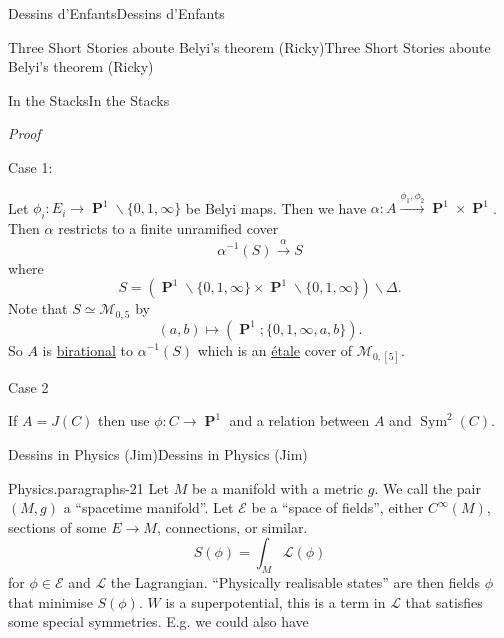 \documentclass[10pt,]{book}
\makeatletter
\renewcommand*{\proofname}{Proof}
\renewenvironment{proof}[1][\proofname]{\par
  \pushQED{\qed}%
  \normalfont \topsep6\p@\@plus6\p@\relax
  \trivlist
  \item\relax
    {\itshape
    #1\@addpunct{.}}\hspace\labelsep\ignorespaces
}{%
  \popQED\endtrivlist\@endpefalse
}
\numberwithin{equation}{section}
\newcommand{\cinf}{C^\infty}
\newcommand{\inv}{^{-1}}
\newcommand{\lb}{[}
\newcommand{\rb}{]}
\DeclareMathOperator{\PP}{\mathbf{P}}
\DeclareMathOperator{\Sym}{Sym}
\makeatother
\begin{document}
\begin{chapterptx}{Dessins d'Enfants}{}{Dessins d'Enfants}{}{}
\begin{sectionptx}{Three Short Stories aboute Belyi's theorem (Ricky)}{}{Three Short Stories aboute Belyi's theorem (Ricky)}{}{}
\begin{subsectionptx}{In the Stacks}{}{In the Stacks}{}{}
\begin{proof}
\hypertarget{p-766}{}%
Case 1:%
\par
\hypertarget{p-767}{}%
Let \(\phi_i \colon E_i \to \PP^1\smallsetminus \{0,1,\infty\}\) be Belyi maps. Then we have \(\alpha \colon A \xrightarrow{\phi_1,\phi_2} \PP^1 \times \PP^1\). Then \(\alpha\) restricts to a finite unramified cover%
\begin{equation*}
\alpha\inv (S) \xrightarrow \alpha S
\end{equation*}
where%
\begin{equation*}
S = (\PP^1 \smallsetminus \{0,1,\infty\} \times \PP^1 \smallsetminus \{0,1,\infty\}) \smallsetminus \Delta\text{.}
\end{equation*}
Note that \(S \simeq \mathcal M_{0,5}\) by%
\begin{equation*}
(a,b ) \mapsto (\PP^1; \{0,1,\infty, a,b\})\text{.}
\end{equation*}
So \(A\) is \hyperref[def-birational]{birational} to \(\alpha\inv (S)\) which is an \hyperref[def-etale]{étale} cover of \(\mathcal M_{0,\lb 5 \rb}\).%
\par
\hypertarget{p-768}{}%
Case 2%
\par
\hypertarget{p-769}{}%
If \(A = J(C)\) then use \(\phi \colon C \to \PP^1\) and a relation between \(A\) and \(\Sym^2(C)\).%
\end{proof}
\end{subsectionptx}
\end{sectionptx}
%
%
\typeout{************************************************}
\typeout{************************************************}
%
\begin{sectionptx}{Dessins in Physics (Jim)}{}{Dessins in Physics (Jim)}{}{}\label{sec-dessins-physics}
\begin{paragraphs}{Physics.}{paragraphs-21}%
\hypertarget{p-770}{}%
Let  \(M\)  be a manifold with  a metric \(g\). We call the pair \((M,g)\) a ``spacetime manifold''. Let \(\mathcal E\) be  a ``space of fields'', either \(\cinf (M)\), sections of some \(E\to M\), connections, or similar.%
\begin{equation*}
S(\phi) = \int_M \mathcal    L (\phi)
\end{equation*}
for \(\phi\in \mathcal E\) and \(\mathcal L\) the Lagrangian. ``Physically realisable states'' are then fields \(\phi\) that minimise \(S(\phi)\). \(W\) is a superpotential, this is a term in \(\mathcal L\) that satisfies some special symmetries. E.g. we could also have%
\begin{equation*}

\end{equation*}
\end{paragraphs}
\end{sectionptx}
\end{chapterptx}
\end{document}
